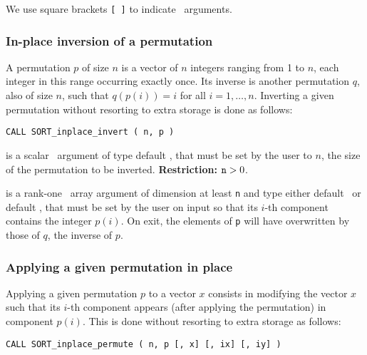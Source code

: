 \documentclass{galahad}
\newcommand{\packagename}{SORT}
\begin{document}
\noindent 
We use square brackets {\tt [ ]} to indicate \optional\ arguments.

\subsubsection{In-place inversion of a permutation}

A permutation $p$ of size $n$ is a vector of $n$ integers ranging from 1 to $n$,
each integer in this range occurring exactly once. Its inverse is another
permutation $q$, also of size $n$, such that $q(p(i))=i$ for all $i=1,\ldots,n$.
Inverting a given permutation without resorting to extra storage is done as
follows:
\vspace*{1mm}

\hspace{8mm}
{\tt CALL \packagename\_inplace\_invert ( n, p )}

\vspace*{-3mm}
\begin{description}
 is a scalar \intentin\ argument of type default
\integer, that must be set by the user to $n$, the size of the permutation to
be inverted.
{\bf Restriction:} ${\tt n} > 0$. 
 
 is a rank-one \intentinout\ array argument of
dimension at least {\tt n} and type either default
\integer\ or default \realdp, that must be set by the user 
on input so that its $i$-th component contains the integer $p(i)$.
On exit, the elements of {\tt p} will have overwritten by those of $q$, the
inverse of $p$.
 
\end{description}

\subsubsection{Applying a given permutation in place}

Applying a given permutation $p$ to a vector $x$ consists in modifying the
vector $x$ such that its $i$-th component appears (after applying the
permutation) in component $p(i)$.
This is done without resorting to extra storage as follows:
\vspace*{1mm}

{\tt CALL \packagename\_inplace\_permute ( n, p [, x] [, ix] [, iy] )}
\end{document}
